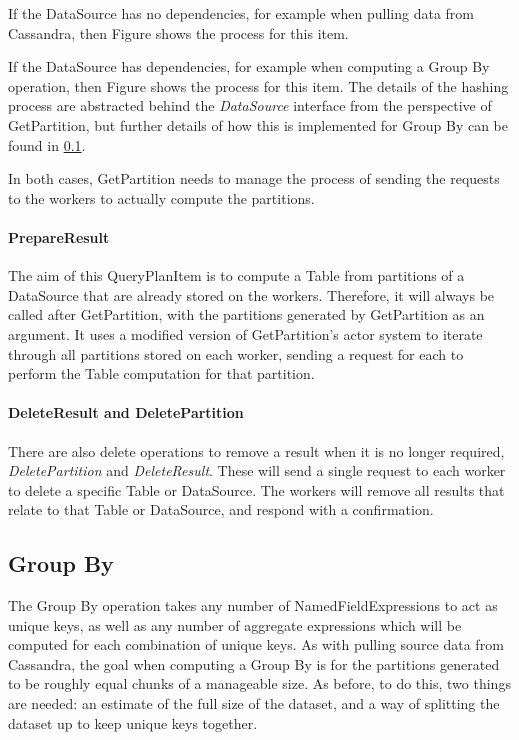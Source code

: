 If the DataSource has no dependencies, for example when pulling data from Cassandra, then Figure  shows the process for this item. 


If the DataSource has dependencies, for example when computing a Group By operation, then Figure  shows the process for this item. The details of the hashing process are abstracted behind the \textit{DataSource} interface from the perspective of GetPartition, but further details of how this is implemented for Group By can be found in \ref{subsec:group-by}.


In both cases, GetPartition needs to manage the process of sending the requests to the workers to actually compute the partitions.

\paragraph{PrepareResult}
The aim of this QueryPlanItem is to compute a Table from partitions of a DataSource that are already stored on the workers. Therefore, it will always be called after GetPartition, with the partitions generated by GetPartition as an argument. It uses a modified version of GetPartition's actor system to iterate through all partitions stored on each worker, sending a request for each to perform the Table computation for that partition.

\paragraph{DeleteResult and DeletePartition}
There are also delete operations to remove a result when it is no longer required, \textit{DeletePartition} and \textit{DeleteResult}. These will send a single request to each worker to delete a specific Table or DataSource. The workers will remove all results that relate to that Table or DataSource, and respond with a confirmation.

\subsection{Group By}\label{subsec:group-by}
The Group By operation takes any number of NamedFieldExpressions to act as unique keys, as well as any number of aggregate expressions which will be computed for each combination of unique keys. As with pulling source data from Cassandra, the goal when computing a Group By is for the partitions generated to be roughly equal chunks of a manageable size. As before, to do this, two things are needed: an estimate of the full size of the dataset, and a way of splitting the dataset up to keep unique keys together.

